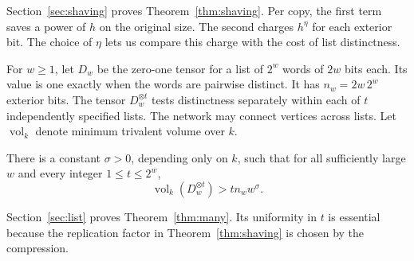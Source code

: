 Section~\ref{sec:shaving} proves Theorem~\ref{thm:shaving}. Per copy,
the first term saves a power of \(h\) on the original size. The second
charges \(h^\eta\) for each exterior bit. The choice of \(\eta\) lets
us compare this charge with the cost of list distinctness.

For \(w\ge1\), let \(D_w\) be the zero-one tensor for a list of \(2^w\)
words of \(2w\) bits each. Its value is one exactly when the words
are pairwise distinct. It has \(n_w=2w\,2^w\) exterior bits. The tensor
\(D_w^{\otimes t}\) tests distinctness separately within each of \(t\)
independently specified lists. The network may connect vertices across
lists. Let \(\operatorname{vol}_k\) denote minimum trivalent volume over \(k\).

\begin{theorem}\label{thm:many}
There is a constant \(\sigma>0\), depending only on \(k\), such that for
all sufficiently large \(w\) and every integer \(1\le t\le 2^w\),
\begin{equation}\label{eq:many}
                  \operatorname{vol}_k(D_w^{\otimes t})
                          >t n_w w^\sigma .
\end{equation}
\end{theorem}

Section~\ref{sec:list} proves Theorem~\ref{thm:many}. Its uniformity
in \(t\) is essential because the replication factor in
Theorem~\ref{thm:shaving} is chosen by the compression.

